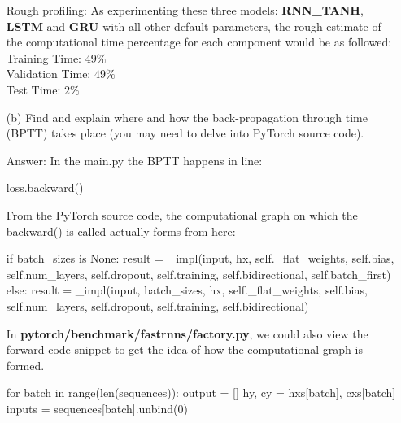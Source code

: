 \documentclass[12pt,letterpaper]{article}
\begin{document}
\begin{itemize}
    
    Rough profiling: As experimenting these three models: \textbf{RNN\_TANH}, \textbf{LSTM} and \textbf{GRU} with all other default parameters, the rough estimate of the computational time percentage for each component would be as followed:\\
    Training Time: $49\%$\\
    Validation Time: $49\%$\\
    Test Time: $2\%$
    
    
    \item[(b)]Find and explain where and how the back-propagation through time (BPTT) takes place (you may need to delve into PyTorch source code).
    
    Answer: In the main.py the BPTT happens in line:
    \begin{python}
        loss.backward()
    \end{python}
    
    From the PyTorch source code, the computational graph on which the backward() is called actually forms from here:
    \begin{python}
    if batch_sizes is None:
        result = _impl(input, hx, self._flat_weights, self.bias, self.num_layers,
         self.dropout, self.training, self.bidirectional, self.batch_first)
    else:
        result = _impl(input, batch_sizes, hx, self._flat_weights, self.bias,
         self.num_layers, self.dropout, self.training, self.bidirectional)
    \end{python}
    
    In \textbf{pytorch/benchmark/fastrnns/factory.py}, we could also view the forward code snippet to get the idea of how the computational graph is formed.
    \begin{python}
        for batch in range(len(sequences)):
            output = []
            hy, cy = hxs[batch], cxs[batch]
            inputs = sequences[batch].unbind(0)


\end{python}
\end{itemize}
\end{document}
